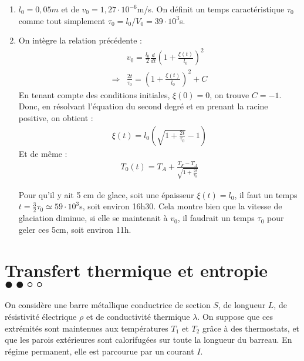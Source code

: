 \begin{correction}
\begin{enumerate}
	\item $l_0= 0,05m$ et de $v_0=1,27\cdot10^{-6}$m/s. On définit un temps caractéristique $\tau_0$ comme tout simplement $\tau_0=l_0/V_0=39\cdot10^{3}$s.
	
	\item On intègre la relation précédente :
	\begin{align*}
			&v_0=\frac{l_0}{2}\frac{d}{dt}\left(1+\frac{\xi(t)}{l_0} \right)^2 \\
			\Rightarrow & \frac{2t}{\tau_0}=\left(1+\frac{\xi(t)}{l_0} \right)^2+C
	\end{align*}
	En tenant compte des conditions initiales, $\xi(0)=0$, on trouve $C=-1$.
	Donc, en résolvant l'équation du second degré et en prenant la racine positive, on obtient :
	\begin{align*}
		\xi(t) = l_0\left( \sqrt{1+\frac{2t}{\tau_0}}-1\right) 
	\end{align*}
	Et de même : 
	\begin{align*}
		T_0(t)=T_A+\frac{T_F-T_A}{\sqrt{1+\frac{2t}{\tau_0}}}
	\end{align*}
	
	Pour qu'il y ait 5 cm de glace, soit une épaisseur $\xi(t)=l_0$, il faut un temps $t=\frac{3}{2}\tau_0\simeq59\cdot10^{3}$s, soit environ 16h30. Cela montre bien que la vitesse de glaciation diminue, si elle se maintenait à $v_0$, il faudrait un temps $\tau_0$ pour geler ces 5cm, soit environ 11h. 

\end{enumerate}

\end{correction}

\newpage

\section{Transfert thermique et entropie $\bullet\bullet\circ\circ$}

On considère une barre métallique conductrice de section $S$, de longueur $L$, de résistivité électrique $\rho$ et de conductivité thermique $\lambda$. On suppose que ces extrémités sont maintenues aux températures $T_1$ et $T_2$ grâce à des thermostats, et que les parois extérieures sont calorifugées sur toute la longueur du barreau. En régime permanent, elle est parcourue par un courant $I$.

